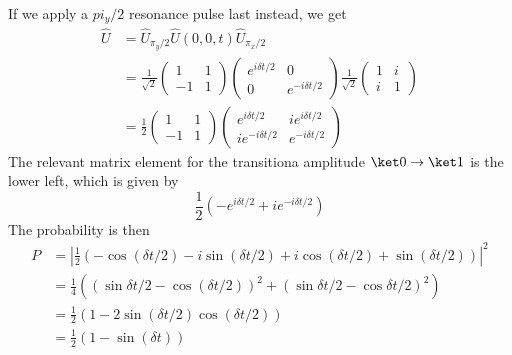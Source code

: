 \documentclass[12pt]{article}
\begin{document}
\begin{ans}
If we apply a $pi_y/2$ resonance pulse last instead, we get 
\begin{align*}
\hat U &= \hat U_{\pi_y/2} \hat U(0, 0, t) \hat U_{\pi_x/2}\\ 
   &= \frac1{\sqrt 2}\begin{pmatrix}
        1 & 1 \\ -1 & 1
    \end{pmatrix}\begin{pmatrix}
       e^{i\delta t/2} & 0 \\
        0 & e^{-i\delta t/2}
    \end{pmatrix} \frac1{\sqrt 2}\begin{pmatrix}
        1 & i \\ i & 1
    \end{pmatrix}\\
    &= \frac12 \begin{pmatrix}
        1 & 1 \\ -1 & 1
    \end{pmatrix} \begin{pmatrix}
        e^{i\delta t/2} & i e^{i\delta t/2}\\
        i e^{-i\delta t/2} & e^{-i\delta t/2}
    \end{pmatrix}
\end{align*}
The relevant matrix element for the transitiona amplitude $\ket 0 \to \ket 1$ is the lower left, which is given by 
\[\frac12(-e^{i\delta t/2} + ie^{-i\delta t/2})\]
The probability is then 
\begin{align*}
    P &= |\frac12(-\cos(\delta t/2) - i\sin(\delta t/2) + i\cos(\delta t/2) + \sin(\delta t/2))|^2\\
    &= \frac14((\sin \delta t/2 - \cos(\delta t/2))^2 + (\sin \delta t/2 - \cos \delta t/2)^2)\\
    &= \frac12(1 - 2\sin(\delta t/2)\cos(\delta t/2))\\
    &= \frac12(1 - \sin(\delta t))
\end{align*}
\end{ans}
\end{document}
